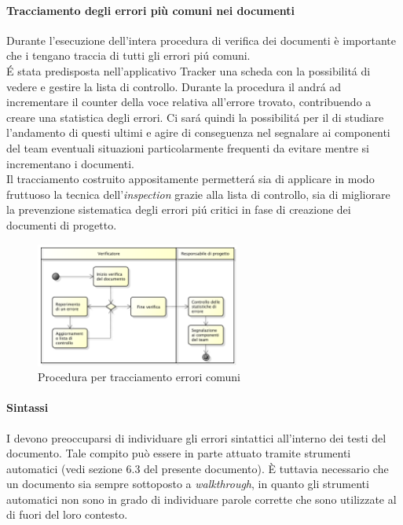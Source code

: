 			\paragraph{Tracciamento degli errori più comuni nei documenti}
			Durante l'esecuzione dell'intera procedura di verifica dei documenti è importante che i  tengano traccia di tutti gli errori pi\'u comuni. \\
			\'E stata predisposta nell'applicativo Tracker una scheda con la possibilit\'a di vedere e gestire la lista di controllo. Durante la procedura il  andr\'a ad incrementare il counter della voce relativa all'errore trovato, contribuendo a creare una statistica degli errori. Ci sar\'a quindi la possibilit\'a per il  di studiare l'andamento di questi ultimi e agire di conseguenza nel segnalare ai componenti del team eventuali situazioni particolarmente frequenti da evitare mentre si incrementano i documenti.\\
			Il tracciamento costruito appositamente permetter\'a sia di applicare in modo fruttuoso la tecnica dell'\textit{inspection} grazie alla lista di controllo, sia di migliorare la prevenzione sistematica degli errori pi\'u critici in fase di creazione dei documenti di progetto.
			\begin{figure}[H]
					\centering
					\includegraphics[width=0.6\textwidth]{NormeDiProgetto/Pics/ProceduraDecrementoErrori}
					\caption{Procedura per tracciamento errori comuni}
			\end{figure}
			
			\paragraph{Sintassi}
				I  devono preoccuparsi di individuare gli errori sintattici all'interno dei testi del documento. Tale compito può essere in 
				parte attuato tramite strumenti automatici (vedi sezione 6.3 del presente documento). È tuttavia necessario che un documento sia sempre sottoposto a \textit{walkthrough}, in quanto gli strumenti automatici non sono in grado di individuare parole corrette che sono utilizzate al di fuori del loro contesto.\\
